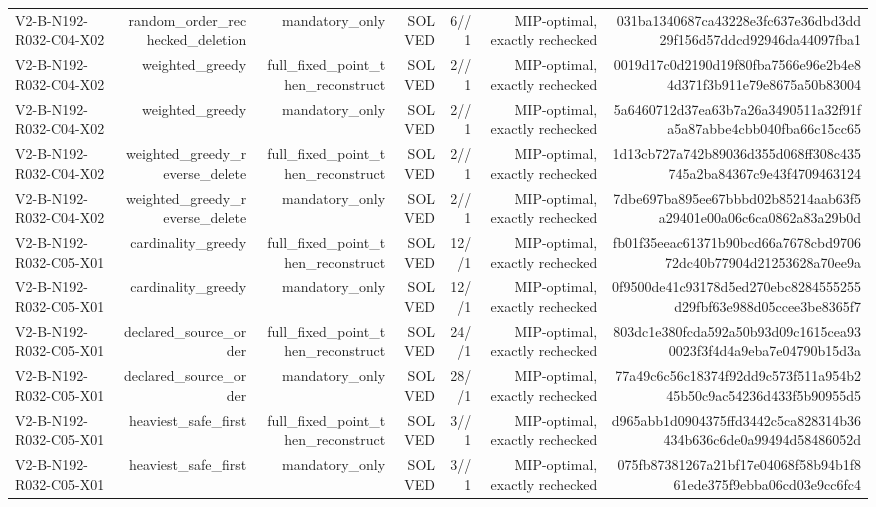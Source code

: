 {\begin{longtable}{lrrrrrr}
V2-B-N192-R032-C04-X02 & random\_order\_rechecked\_deletion & mandatory\_only & SOLVED & 6//1 & MIP-optimal, exactly rechecked & 031ba1340687ca43228e3fc637e36dbd3dd29f156d57ddcd92946da44097fba1 \\
V2-B-N192-R032-C04-X02 & weighted\_greedy & full\_fixed\_point\_then\_reconstruct & SOLVED & 2//1 & MIP-optimal, exactly rechecked & 0019d17c0d2190d19f80fba7566e96e2b4e84d371f3b911e79e8675a50b83004 \\
V2-B-N192-R032-C04-X02 & weighted\_greedy & mandatory\_only & SOLVED & 2//1 & MIP-optimal, exactly rechecked & 5a6460712d37ea63b7a26a3490511a32f91fa5a87abbe4cbb040fba66c15cc65 \\
V2-B-N192-R032-C04-X02 & weighted\_greedy\_reverse\_delete & full\_fixed\_point\_then\_reconstruct & SOLVED & 2//1 & MIP-optimal, exactly rechecked & 1d13cb727a742b89036d355d068ff308c435745a2ba84367c9e43f4709463124 \\
V2-B-N192-R032-C04-X02 & weighted\_greedy\_reverse\_delete & mandatory\_only & SOLVED & 2//1 & MIP-optimal, exactly rechecked & 7dbe697ba895ee67bbbd02b85214aab63f5a29401e00a06c6ca0862a83a29b0d \\
V2-B-N192-R032-C05-X01 & cardinality\_greedy & full\_fixed\_point\_then\_reconstruct & SOLVED & 12//1 & MIP-optimal, exactly rechecked & fb01f35eeac61371b90bcd66a7678cbd970672dc40b77904d21253628a70ee9a \\
V2-B-N192-R032-C05-X01 & cardinality\_greedy & mandatory\_only & SOLVED & 12//1 & MIP-optimal, exactly rechecked & 0f9500de41c93178d5ed270ebc8284555255d29fbf63e988d05ccee3be8365f7 \\
V2-B-N192-R032-C05-X01 & declared\_source\_order & full\_fixed\_point\_then\_reconstruct & SOLVED & 24//1 & MIP-optimal, exactly rechecked & 803dc1e380fcda592a50b93d09c1615cea930023f3f4d4a9eba7e04790b15d3a \\
V2-B-N192-R032-C05-X01 & declared\_source\_order & mandatory\_only & SOLVED & 28//1 & MIP-optimal, exactly rechecked & 77a49c6c56c18374f92dd9c573f511a954b245b50c9ac54236d433f5b90955d5 \\
V2-B-N192-R032-C05-X01 & heaviest\_safe\_first & full\_fixed\_point\_then\_reconstruct & SOLVED & 3//1 & MIP-optimal, exactly rechecked & d965abb1d0904375ffd3442c5ca828314b36434b636c6de0a99494d58486052d \\
V2-B-N192-R032-C05-X01 & heaviest\_safe\_first & mandatory\_only & SOLVED & 3//1 & MIP-optimal, exactly rechecked & 075fb87381267a21bf17e04068f58b94b1f861ede375f9ebba06cd03e9cc6fc4 \\

\end{longtable}}

